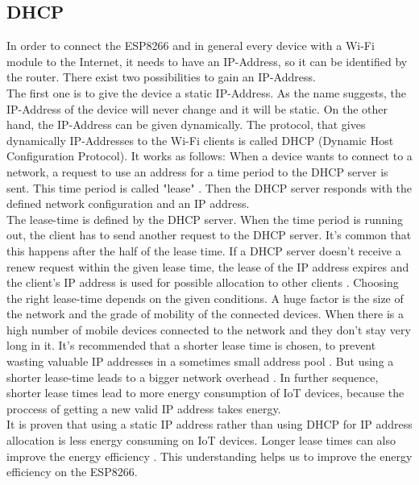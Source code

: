 \subsection{DHCP}
In order to connect the ESP8266 and in general every device with a Wi-Fi module to the Internet, it needs to have an IP-Address, so it can be identified by the router. 
There exist two possibilities to gain an IP-Address.\\ The first one is to give the device a static IP-Address. As the name suggests, the IP-Address of the device will never change and it will be static. On the other hand, the IP-Address can be given dynamically.
The protocol, that gives dynamically IP-Addresses to the Wi-Fi clients is called DHCP (Dynamic Host Configuration Protocol).
It works as follows: When a device wants to connect to a network, a request to use an address for a time period to the DHCP server is sent. This time period is called "lease" \cite{droms1997rfc2131}. Then the DHCP server responds with the defined network configuration and an IP address.\\
The lease-time is defined by the DHCP server. When the time period is running out, the client has to send another request to the DHCP server. It's common that this happens after the half of the lease time.
If a DHCP server doesn't receive a renew request within the given lease time, the lease of the IP address expires and the client's IP address is used for possible allocation to other clients \cite{10.1145/1298306.1298315}.
Choosing the right lease-time depends on the given conditions. A huge factor is the size of the network and the grade of mobility of the connected devices. When there is a high number of mobile devices connected to the network and they don't stay very long in it. It's recommended that a shorter lease time is chosen, to prevent wasting valuable IP addresses in a sometimes small address pool \cite{khadilkar2007usage}.
But using a shorter lease-time leads to a bigger network overhead \cite{li_how_2018}. In further sequence, shorter lease times lead to more energy consumption of IoT devices, because the proccess of getting a new valid IP address takes energy.\\
It is proven that using a static IP address rather than using DHCP for IP address allocation is less energy consuming on IoT devices. Longer lease times can also improve the energy efficiency \cite{department_of_computer_engineering_mehmet_akif_ersoy_university_faculty_of_engineering_and_architecture_burdur_turkey_power_2020}. This understanding helps us to improve the energy efficiency on the ESP8266.



